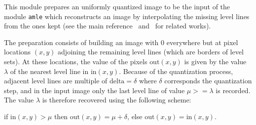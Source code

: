 This module prepares an uniformly quantized image to be the input of the 
module \verb+amle+ which reconstructs
an image by interpolating the missing level lines from the ones kept
(see the main reference~\cite{caselles.morel.ea:axiomatic} 
and~\cite{aronsson:extension}\cite{cao:absolutely}\cite{froment:functional} for
related works).

The preparation consists of building an image with $0$ everywhere but
at pixel locations $(x,y)$ adjoining the remaining level lines (which are borders of level sets).
At these locations, the value of the pixels $\mbox{out}(x,y)$ is given by the 
value $\lambda$ of the nearest level line in $\mbox{in}(x,y)$.
Because of the quantization process, adjacent level lines are multiple
of $\mbox{delta}=\delta$ where $\delta$ corresponds the quantization step, 
and in the input image only the last level line of value $\mu >= \lambda$ is
recorded. The value $\lambda$ is therefore recovered using the following 
scheme:

if $\mbox{in}(x,y) > \mu$ then $\mbox{out}(x,y) = \mu + \delta$,
else  $\mbox{out}(x,y) = \mbox{in}(x,y)$.
